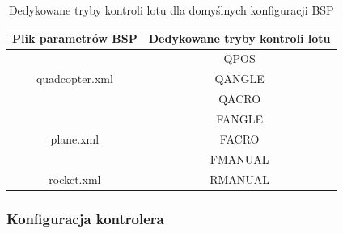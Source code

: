 \documentclass[15pt]{sprawozdanie}
\begin{document}
\begin{table}[!ht]	
	\label{modesTable}
	\begin{center}
		\begin{tabular}{ |c|c| } 
			\hline
			Plik parametrów BSP & Dedykowane tryby kontroli lotu \\
			\hline
			\multirow{3}{4em}{quadcopter.xml} 
			& QPOS \\ & QANGLE \\ & QACRO \\
			\hline
			\multirow{3}{4em}{{plane.xml}} 
			& FANGLE \\ & FACRO \\ & FMANUAL \\
			\hline
			\multirow{1}{4em}{{rocket.xml}} 
			& RMANUAL \\
			\hline
		\end{tabular}
		\caption{Dedykowane tryby kontroli lotu dla domyślnych konfiguracji BSP}
	\end{center}
\end{table}

\subsubsection{Konfiguracja kontrolera}
\end{document}
